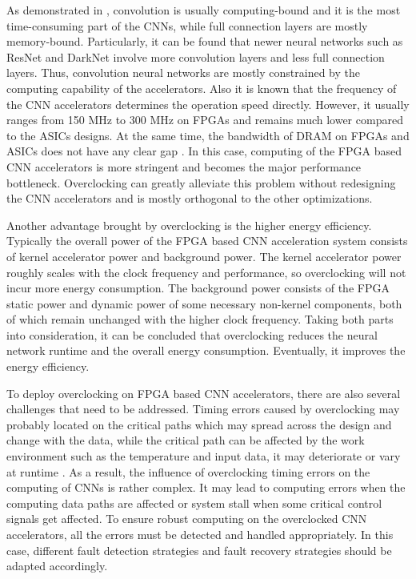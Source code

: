 As demonstrated in \cite{Caffeine_6} \cite{EIE_han_2016}, convolution is usually 
computing-bound and it is the most time-consuming part of the CNNs, while 
full connection layers are mostly memory-bound. Particularly, it can be found that 
newer neural networks such as ResNet and DarkNet involve more 
convolution layers and less full connection layers. Thus, convolution neural 
networks are mostly constrained by the computing capability of the accelerators. 
Also it is known that the frequency of the CNN 
accelerators determines the operation speed directly. However, 
it usually ranges from 150 MHz to 300 MHz on FPGAs and 
remains much lower compared to the ASICs designs. At the same time, the 
bandwidth of DRAM on FPGAs and ASICs does not have any 
clear gap \cite{asic_fpga}. In this case, computing of the FPGA based CNN 
accelerators is more stringent and becomes the major 
performance bottleneck. Overclocking can greatly alleviate this 
problem without redesigning the CNN accelerators and is 
mostly orthogonal to the other optimizations. 

Another advantage brought by overclocking is the higher 
energy efficiency. Typically the overall power of the 
FPGA based CNN acceleration system consists of kernel accelerator power 
and background power. The kernel accelerator power 
roughly scales with the clock frequency and performance, 
so overclocking will not incur more energy consumption. 
The background power consists of the 
FPGA static power and dynamic power of some necessary non-kernel 
components, both of which remain unchanged with the higher
clock frequency. Taking both parts into consideration, it can be 
concluded that overclocking reduces the neural 
network runtime and the overall energy consumption. 
Eventually, it improves the energy efficiency.

To deploy overclocking on FPGA based CNN accelerators, there are also several
challenges that need to be addressed. Timing errors caused by overclocking 
may probably located on the critical paths which may spread across the 
design and change with the data, while the critical path can be
affected by the work environment such as the temperature 
and input data, it may deteriorate or vary at runtime \cite{Paceline_15}. 
As a result, the influence of overclocking timing 
errors on the computing of CNNs is rather complex. It may lead to
computing errors when the computing data paths are affected or system stall 
when some critical control signals get affected. To ensure robust computing 
on the overclocked CNN accelerators, all the errors must be detected and 
handled appropriately. In this case, different fault detection strategies 
and fault recovery strategies should be adapted accordingly. 

